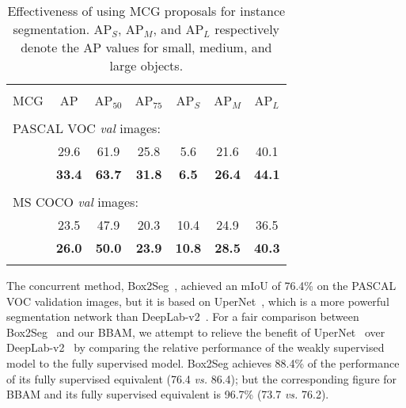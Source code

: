 \documentclass[final]{cvpr}
\newcommand{\xmark}{\text{\ding{55}}}
\newcommand{\cmark}{\text{\ding{51}}}
\begin{document}
\begin{table}[t]
\renewcommand{\arraystretch}{0.92}
  \centering
  \caption{Effectiveness of using MCG proposals for instance segmentation. AP$_{S}$, AP$_{M}$, and AP$_{L}$ respectively denote the AP values for small, medium, and large objects. }
  \vspace{-1em}
    \begin{tabular}{ccccccc}
    \Xhline{1pt}\\[-0.95em]
    
    MCG  & AP   & AP$_{50}$ & AP$_{75}$  & AP$_{S}$   & AP$_{M}$   & AP$_{L}$ \\
    \hline\hline
    \\[-0.9em]  
    \multicolumn{7}{l}{PASCAL VOC \textit{val} images:} \\
     \xmark     &     29.6  &   61.9    &   25.8    &    5.6   &    21.6   & 40.1 \\
    \textcolor{red}{\cmark} &     \textbf{33.4}  &  \textbf{63.7}    &   \textbf{31.8}    &    \textbf{6.5}   &    \textbf{26.4}   & \textbf{44.1} \\
    \hline
    \\[-0.9em]  
    \multicolumn{7}{l}{MS COCO \textit{val} images:} \\
      \xmark    &   23.5    &       47.9 &      20.3 &  10.4     &      24.9 & 36.5 \\
    \textcolor{red}{\cmark} &   \textbf{26.0}    &  \textbf{50.0}     & \textbf{23.9}      & \textbf{10.8}      &   \textbf{28.5}    & \textbf{40.3} \\
\Xhline{1pt}
    \end{tabular}\vspace{-1.2em}
  \label{tab:mcg}\end{table} 
The concurrent method, Box2Seg~\cite{kulharia12356box2seg}, achieved an mIoU of 76.4\% on the PASCAL VOC validation images, but it is based on UperNet~\cite{xiao2018unified}, which is a more powerful segmentation network than DeepLab-v2~\cite{pytorchdeeplab}.
For a fair comparison between Box2Seg~\cite{kulharia12356box2seg} and our BBAM, we attempt to relieve the benefit of UperNet~\cite{xiao2018unified} over DeepLab-v2~\cite{chen2017deeplab} by comparing the relative performance of the weakly supervised model to the fully supervised model.
Box2Seg achieves 88.4\% of the performance of its fully supervised equivalent (76.4 \textit{vs.} 86.4); but the corresponding figure for BBAM and its fully supervised equivalent is 96.7\% (73.7 \textit{vs.} 76.2).
\end{document}
